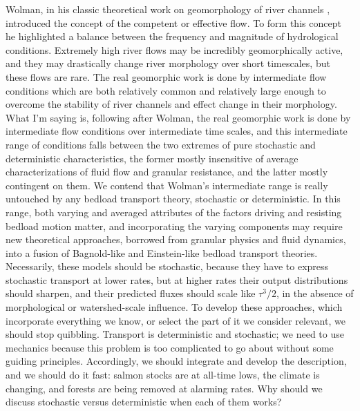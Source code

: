 \documentclass{article}
\begin{document}
Wolman, in his classic theoretical work on geomorphology of river channels \citep{Wolman1968}, introduced the concept of the competent or effective flow. 
To form this concept he highlighted a balance between the frequency and magnitude of hydrological conditions. 
Extremely high river flows may be incredibly geomorphically active, and they may drastically change river morphology over short timescales, but these flows are rare. 
The real geomorphic work is done by intermediate flow conditions which are both relatively common and relatively large enough to overcome the stability of river channels and effect change in their morphology. 
What I'm saying is, following after Wolman, the real geomorphic work is done by intermediate flow conditions over intermediate time scales, and this intermediate range of conditions falls between the two extremes of pure stochastic and deterministic characteristics, the former mostly insensitive of average characterizations of fluid flow and granular resistance, and the latter mostly contingent on them. 
We contend that Wolman's intermediate range is really untouched by any bedload transport theory, stochastic or deterministic.  
In this range, both varying and averaged attributes of the factors driving and resisting bedload motion matter, and incorporating the varying components may require new theoretical approaches, borrowed from granular physics and fluid dynamics, into a fusion of Bagnold-like and Einstein-like bedload transport theories.
Necessarily, these models should be stochastic, because they have to express stochastic transport at lower rates, but at higher rates their output distributions should sharpen, and their predicted fluxes should scale like $\tau^3/2$, in the absence of morphological or watershed-scale influence. 
To develop these approaches, which incorporate everything we know, or select the part of it we consider relevant, we should stop quibbling. 
Transport is deterministic and stochastic; we need to use mechanics because this problem is too complicated to go about without some guiding principles. 
Accordingly, we should integrate and develop the description, and we should do it fast: salmon stocks are at all-time lows, the climate is changing, and forests are being removed at alarming rates. 
Why should we discuss stochastic versus deterministic when each of them works? 

  
\end{document}
